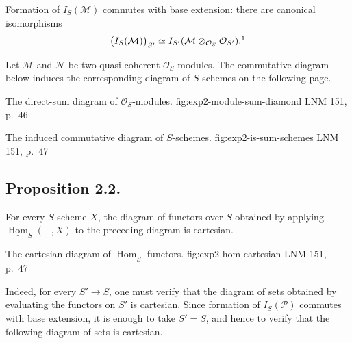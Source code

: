 %
Formation of \(I_S(\mathcal M)\) commutes with base extension: there are
canonical isomorphisms
\[
  \bigl(I_S(\mathcal M)\bigr)_{S'}
  \simeq I_{S'}(\mathcal M\otimes_{\mathcal O_S}\mathcal O_{S'}).\footnotemark
\]

%
Let \(\mathcal M\) and \(\mathcal N\) be two quasi-coherent
\(\mathcal O_S\)-modules. The commutative diagram below induces the
corresponding diagram of \(S\)-schemes on the following page.

  {The direct-sum diagram of \(\mathcal O_S\)-modules.}
  {fig:exp2-module-sum-diamond}
  {LNM 151, p.~46}

  {The induced commutative diagram of \(S\)-schemes.}
  {fig:exp2-is-sum-schemes}
  {LNM 151, p.~47}

\subsection*{Proposition 2.2.}
For every \(S\)-scheme \(X\), the diagram of functors over \(S\) obtained
by applying \(\underline{\operatorname{Hom}}_S(-,X)\) to the preceding
diagram is cartesian.

  {The cartesian diagram of \(\underline{\operatorname{Hom}}_S\)-functors.}
  {fig:exp2-hom-cartesian}
  {LNM 151, p.~47}

Indeed, for every \(S'\to S\), one must verify that the diagram of sets
obtained by evaluating the functors on \(S'\) is cartesian. Since formation
of \(I_S(\mathcal P)\) commutes with base extension, it is enough to take
\(S'=S\), and hence to verify that the following diagram of sets is
cartesian.


